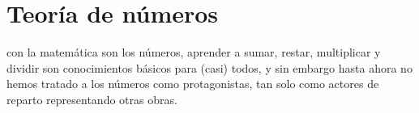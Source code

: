 \chapter{Teoría de números} %
\label{cha:teoria_de_numeros}

\noindent {} con la
matemática son los números, aprender a sumar, restar, multiplicar y dividir son
conocimientos básicos para (casi) todos, y sin embargo hasta ahora no hemos
tratado a los números como protagonistas, tan solo como actores de reparto
representando otras obras.


